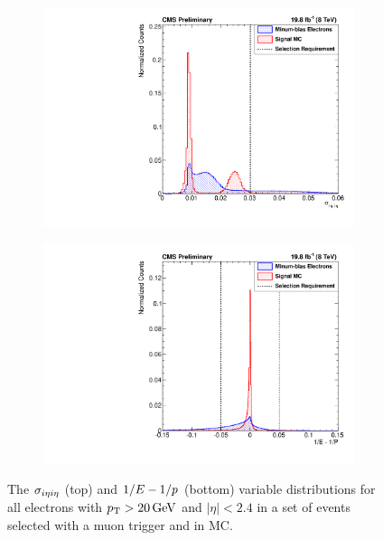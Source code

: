 \begin{figure}[!htbp]
    \centering
    \begin{subfigure}[b]{\StackedPlotWidth}
        \includegraphics[width=\textwidth]{figures/e_reco_var_sigma_ieta_ieta.pdf}
        \caption{}
        \label{fig:sieie}
    \end{subfigure}
    \begin{subfigure}[b]{\StackedPlotWidth}
        \includegraphics[width=\textwidth]{figures/e_reco_var_1oe_1op.pdf}
        \caption{}
        \label{fig:ooeoop}
    \end{subfigure}
    \caption[
        Distributions of $\sigmaietaieta$ and $\ooeoop$ in data and MC.
    ]{
        The $\sigmaietaieta$ (top) and $\ooeoop$ (bottom) variable
        distributions for all electrons with $p_{\mathrm{T}} > 20 \,\text{Ge\hspace{-.08em}V}$ and $|\eta| < 2.4$
        in a set of events selected with a muon trigger and in \MADGRAPH \Ztoee
        MC.
    }
    \label{fig:sieie_ooeoop}
\end{figure}

